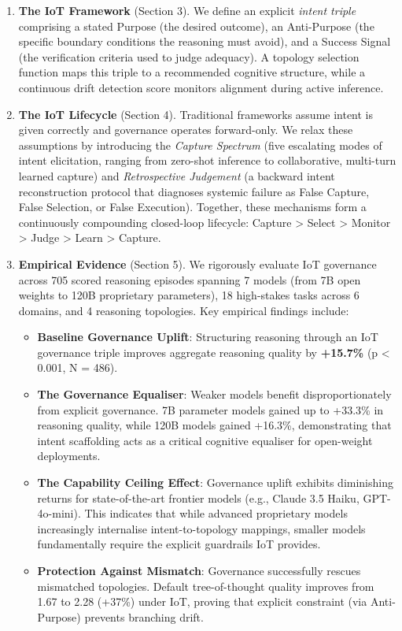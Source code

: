 \documentclass[11pt,a4paper]{article}
\providecommand{\tightlist}{%
  \setlength{\itemsep}{0pt}\setlength{\parskip}{0pt}}
\begin{document}
\begin{enumerate}
\def\labelenumi{\arabic{enumi}.}
\item
  \textbf{The IoT Framework} (Section 3). We define an explicit
  \emph{intent triple} comprising a stated Purpose (the desired
  outcome), an Anti-Purpose (the specific boundary conditions the
  reasoning must avoid), and a Success Signal (the verification criteria
  used to judge adequacy). A topology selection function maps this
  triple to a recommended cognitive structure, while a continuous drift
  detection score monitors alignment during active inference.
\item
  \textbf{The IoT Lifecycle} (Section 4). Traditional frameworks assume
  intent is given correctly and governance operates forward-only. We
  relax these assumptions by introducing the \emph{Capture Spectrum}
  (five escalating modes of intent elicitation, ranging from zero-shot
  inference to collaborative, multi-turn learned capture) and
  \emph{Retrospective Judgement} (a backward intent reconstruction
  protocol that diagnoses systemic failure as False Capture, False
  Selection, or False Execution). Together, these mechanisms form a
  continuously compounding closed-loop lifecycle: Capture \textgreater{}
  Select \textgreater{} Monitor \textgreater{} Judge \textgreater{}
  Learn \textgreater{} Capture.
\item
  \textbf{Empirical Evidence} (Section 5). We rigorously evaluate IoT
  governance across 705 scored reasoning episodes spanning 7 models
  (from 7B open weights to 120B proprietary parameters), 18 high-stakes
  tasks across 6 domains, and 4 reasoning topologies. Key empirical
  findings include:

  \begin{itemize}
  \tightlist
  \item
    \textbf{Baseline Governance Uplift}: Structuring reasoning through
    an IoT governance triple improves aggregate reasoning quality by
    \textbf{+15.7\%} (p \textless{} 0.001, N = 486).
  \item
    \textbf{The Governance Equaliser}: Weaker models benefit
    disproportionately from explicit governance. 7B parameter models
    gained up to +33.3\% in reasoning quality, while 120B models gained
    +16.3\%, demonstrating that intent scaffolding acts as a critical
    cognitive equaliser for open-weight deployments.
  \item
    \textbf{The Capability Ceiling Effect}: Governance uplift exhibits
    diminishing returns for state-of-the-art frontier models (e.g.,
    Claude 3.5 Haiku, GPT-4o-mini). This indicates that while advanced
    proprietary models increasingly internalise intent-to-topology
    mappings, smaller models fundamentally require the explicit
    guardrails IoT provides.
  \item
    \textbf{Protection Against Mismatch}: Governance successfully
    rescues mismatched topologies. Default tree-of-thought quality
    improves from 1.67 to 2.28 (+37\%) under IoT, proving that explicit
    constraint (via Anti-Purpose) prevents branching drift.
  \end{itemize}
\end{enumerate}
\end{document}
